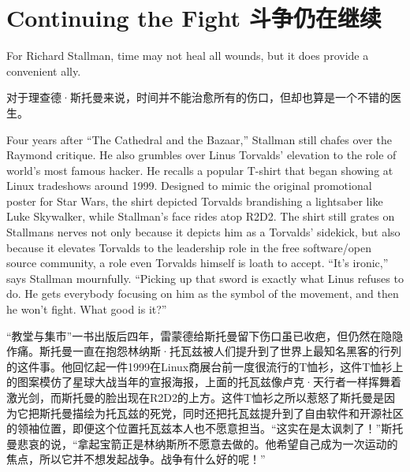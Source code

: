 

\chapter{\ifdefined\eng
Continuing the Fight
\fi
\ifdefined\chs
斗争仍在继续
\fi}

\ifdefined\eng
For Richard Stallman, time may not heal all wounds, but it does provide a convenient ally.
\fi

\ifdefined\chs
对于理查德·斯托曼来说，时间并不能治愈所有的伤口，但却也算是一个不错的医生。
\fi

\ifdefined\eng
Four years after ``The Cathedral and the Bazaar,'' Stallman still chafes over the Raymond critique. He also grumbles over Linus Torvalds' elevation to the role of world's most famous hacker. He recalls a popular T-shirt that began showing at Linux tradeshows around 1999. Designed to mimic the original promotional poster for Star Wars, the shirt depicted Torvalds brandishing a lightsaber like Luke Skywalker, while Stallman's face rides atop R2D2. The shirt still grates on Stallmans nerves not only because it depicts him as a Torvalds' sidekick, but also because it elevates Torvalds to the leadership role in the free software/open source community, a role even Torvalds himself is loath to accept. ``It's ironic,'' says Stallman mournfully. ``Picking up that sword is exactly what Linus refuses to do. He gets everybody focusing on him as the symbol of the movement, and then he won't fight. What good is it?''
\fi

\ifdefined\chs
``教堂与集市''一书出版后四年，雷蒙德给斯托曼留下伤口虽已收疤，但仍然在隐隐作痛。斯托曼一直在抱怨林纳斯·托瓦兹被人们提升到了世界上最知名黑客的行列的这件事。他回忆起一件1999在Linux商展台前一度很流行的T恤衫，这件T恤衫上的图案模仿了星球大战当年的宣报海报，上面的托瓦兹像卢克·天行者一样挥舞着激光剑，而斯托曼的脸出现在R2D2的上方。这件T恤衫之所以惹怒了斯托曼是因为它把斯托曼描绘为托瓦兹的死党，同时还把托瓦兹提升到了自由软件和开源社区的领袖位置，即便这个位置托瓦兹本人也不愿意担当。``这实在是太讽刺了！''斯托曼悲哀的说，``拿起宝箭正是林纳斯所不愿意去做的。他希望自己成为一次运动的焦点，所以它并不想发起战争。战争有什么好的呢！''
\fi


